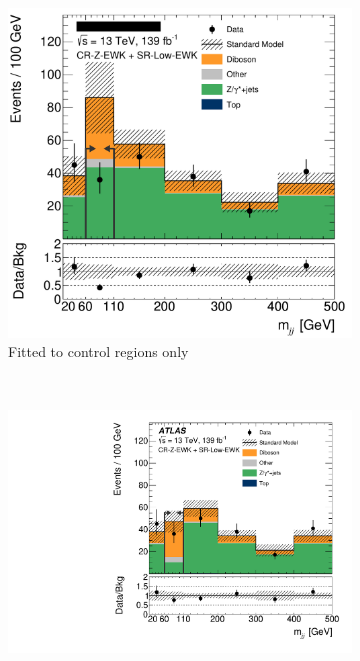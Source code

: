 \begin{figure}[tp]
\centering
\begin{subfigure}{0.62\textwidth}
\centering
\includegraphics[width=\textwidth]{figures/2ljets_aux_CR_Z_EWKSR_Low_EWK_mjj_no_sr.png}
\caption{Fitted to control regions only}
\label{fig:2ljets_low_crz_pre_post_pre}
\end{subfigure}
\\
\begin{subfigure}{0.62\textwidth}
\centering
\includegraphics[width=\textwidth]{figures/2ljets_aux_CR_Z_EWKSR_Low_EWK_mjj.pdf}

\end{subfigure}
\end{figure}
